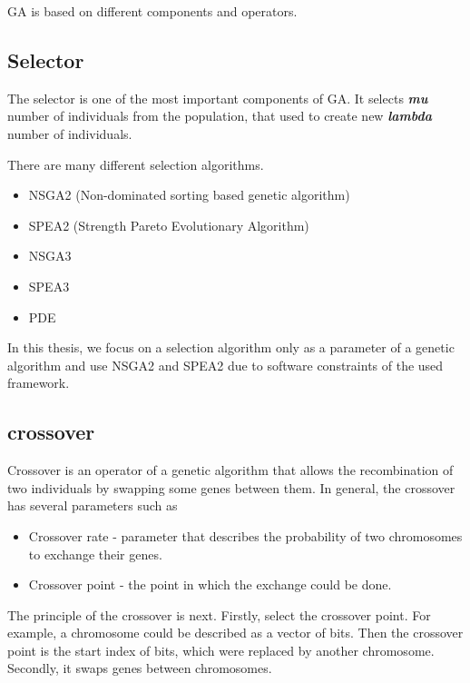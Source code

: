 GA is based on different components and operators.

\subsection{Selector}\label{sec:GeneticAlgorithm:Selector}

The selector is one of the most important components of GA. It selects \textit{\textbf{mu}} number of individuals from the population, that used to create new \textit{\textbf{lambda}} number of individuals.

There are many different selection algorithms.

\begin{itemize}
	\item NSGA2 (Non-dominated sorting based genetic algorithm)
	\item SPEA2 (Strength Pareto Evolutionary Algorithm)
	\item NSGA3
	\item SPEA3
	\item PDE 
\end{itemize}

In this thesis, we focus on a selection algorithm only as a parameter of a genetic algorithm and use NSGA2 and SPEA2 due to software constraints of the used framework. 

\subsection{crossover}\label{sec:GeneticAlgorithmCrossover}

Crossover is an operator of a genetic algorithm that allows the recombination of two individuals by swapping some genes between them.
In general, the crossover has several parameters such as

\begin{itemize}
	\item Crossover rate - parameter that describes the probability of two chromosomes to exchange their genes.
	\item Crossover point - the point in which the exchange could be done.
\end{itemize}

The principle of the crossover is next.
Firstly, select the crossover point. For example, a chromosome could be described as a vector of bits. Then the crossover point is the start index of bits, which were replaced by another chromosome.
Secondly, it swaps genes between chromosomes.


